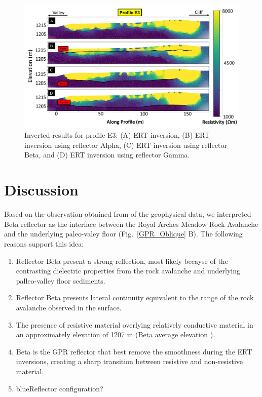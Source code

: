 \documentclass[5p]{elsarticle}
\newcommand{\COMON}{\begin{color}{blue}}
\newcommand{\COMOFF}{\end{color}}
\begin{document}
							 \begin{figure}[h]

	\includegraphics[width=\textwidth]{Figures/ERT_inversion.pdf}
		\caption{Inverted results for profile E3: (A) ERT inversion, (B) ERT inversion using reflector Alpha, (C) ERT inversion using reflector Beta, and (D) ERT inversion using reflector Gamma.\label{ERT_inversion}}

								   \end{figure}

\bigskip


\section{Discussion}

Based on the observation obtained from of the geophysical data, we interpreted Beta reflector as the interface between the Royal Arches Meadow Rock Avalanche and the underlying paleo-valey floor (Fig.~\ref{GPR_Oblique} B). The following reasons support this idea: 

\begin{enumerate}[I]
    \item Reflector Beta present a strong reflection, most likely becayse of the contrasting dielectric properties from the rock avalanche and underlying palleo-valley floor sediments. 
    
    \item Reflector Beta presents lateral continuity equivalent to the range of the rock avalanche observed in the surface.  
    
    \item The presence of resistive material overlying relatively conductive material in an approximately elevation of 1207 m (Beta average elevation ). 
    
    \item Beta is the GPR reflector that best remove the smoothness during the ERT inversions, creating a sharp transition between resistive and non-resistive material.
    
    \item  \COMON Reflector configuration? \COMOFF 
\end{enumerate}
\end{document}
